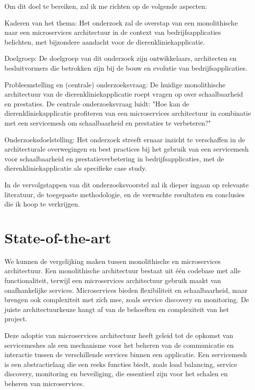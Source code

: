 Om dit doel te bereiken, zal ik me richten op de volgende aspecten:

Kaderen van het thema: Het onderzoek zal de overstap van een monolithische naar een microservices architectuur in de context van bedrijfsapplicaties belichten, met bijzondere aandacht voor de dierenkliniekapplicatie.

Doelgroep: De doelgroep van dit onderzoek zijn ontwikkelaars, architecten en besluitvormers die betrokken zijn bij de bouw en evolutie van bedrijfsapplicaties.

Probleemstelling en (centrale) onderzoeksvraag: De huidige monolithische architectuur van de dierenkliniekapplicatie roept vragen op over schaalbaarheid en prestaties. De centrale onderzoeksvraag luidt: "Hoe kan de dierenkliniekapplicatie profiteren van een microservices architectuur in combinatie met een servicemesh om schaalbaarheid en prestaties te verbeteren?"

Onderzoeksdoelstelling: Het onderzoek streeft ernaar inzicht te verschaffen in de architecturale overwegingen en best practices bij het gebruik van een servicemesh voor schaalbaarheid en prestatieverbetering in bedrijfsapplicaties, met de dierenkliniekapplicatie als specifieke case study.

In de vervolgstappen van dit onderzoeksvoorstel zal ik dieper ingaan op relevante literatuur, de toegepaste methodologie, en de verwachte resultaten en conclusies die ik hoop te verkrijgen.

\section{State-of-the-art}%
\label{sec:state-of-the-art}

We kunnen de vergelijking maken  tussen monolithische en microservices architectuur. Een monolithische architectuur bestaat uit één codebase met alle functionaliteit, terwijl een  microservices architectuur gebruik maakt van onafhankelijke services. Microservices bieden flexibiliteit en schaalbaarheid, maar brengen ook complexiteit met zich mee, zoals service discovery en monitoring. De juiste architectuurkeuze hangt af van de behoeften en complexiteit van het project.

Deze adoptie van microservices architectuur heeft geleid tot de opkomst van servicemeshes als een mechanisme voor het beheren van de communicatie en interactie tussen de verschillende services binnen een applicatie. Een servicemesh is een abstractielaag die een reeks functies biedt, zoals load balancing, service discovery, monitoring en beveiliging, die essentieel zijn voor het schalen en beheren van microservices.

